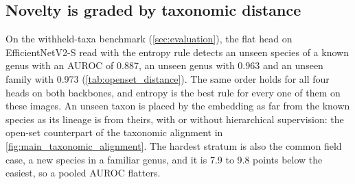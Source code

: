 \subsection{Novelty is graded by taxonomic distance}\label{sec:results_openset}
On the withheld-taxa benchmark (\cref{sec:evaluation}), the flat head on EfficientNetV2-S read with the entropy rule detects an unseen species of a known genus with an AUROC of 0.887, an unseen genus with 0.963 and an unseen family with 0.973 (\cref{tab:openset_distance}).
The same order holds for all four heads on both backbones, and entropy is the best rule for every one of them on these images.
An unseen taxon is placed by the embedding as far from the known species as its lineage is from theirs, with or without hierarchical supervision: the open-set counterpart of the taxonomic alignment in \cref{fig:main_taxonomic_alignment}.
The hardest stratum is also the common field case, a new species in a familiar genus, and it is 7.9 to 9.8 points below the easiest, so a pooled AUROC flatters.

